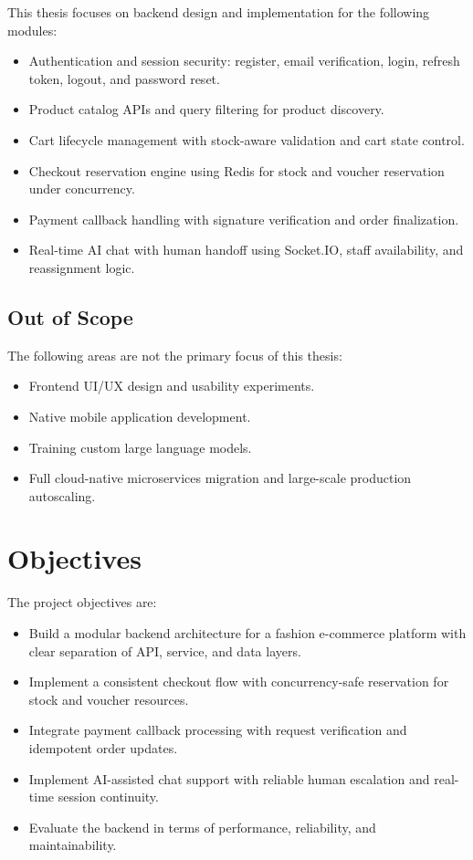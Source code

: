 This thesis focuses on backend design and implementation for the following modules:
\begin{itemize}
    \item Authentication and session security: register, email verification, login, refresh token, logout, and password reset.
    \item Product catalog APIs and query filtering for product discovery.
    \item Cart lifecycle management with stock-aware validation and cart state control.
    \item Checkout reservation engine using Redis for stock and voucher reservation under concurrency.
    \item Payment callback handling with signature verification and order finalization.
    \item Real-time AI chat with human handoff using Socket.IO, staff availability, and reassignment logic.
\end{itemize}

\subsection{Out of Scope}

The following areas are not the primary focus of this thesis:
\begin{itemize}
    \item Frontend UI/UX design and usability experiments.
    \item Native mobile application development.
    \item Training custom large language models.
    \item Full cloud-native microservices migration and large-scale production autoscaling.
\end{itemize}

\section{Objectives}

The project objectives are:
\begin{itemize}
    \item Build a modular backend architecture for a fashion e-commerce platform with clear separation of API, service, and data layers.
    \item Implement a consistent checkout flow with concurrency-safe reservation for stock and voucher resources.
    \item Integrate payment callback processing with request verification and idempotent order updates.
    \item Implement AI-assisted chat support with reliable human escalation and real-time session continuity.
    \item Evaluate the backend in terms of performance, reliability, and maintainability.
\end{itemize}

